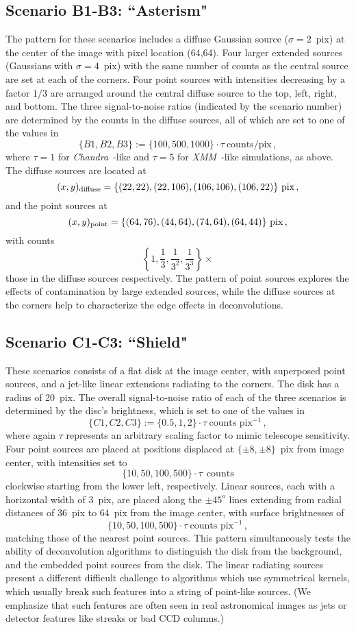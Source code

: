 \documentclass[twocolumn, linenumbers]{aastex631}
\newcommand{\chandra}{\textit{Chandra}~}
\newcommand{\xmm}{\textit{XMM}~}
\begin{document}
    \subsection{Scenario B1-B3: ``Asterism"}
    The pattern for these scenarios includes a diffuse Gaussian source ($\sigma=2$~pix) at the center of the image with pixel location (64,64). Four larger extended sources (Gaussians with $\sigma=4$~pix) with the same number of counts as the central source are set at each of the corners.  Four point sources with intensities decreasing by a factor $1/3$ are arranged around the central diffuse source to the top, left, right, and bottom.  The three signal-to-noise ratios (indicated by the scenario number) are determined by the counts in the diffuse sources, all of which are set to one of the values in $$\{B1, B2, B3\} := \{100, 500, 1000\} \cdot \tau ~\textrm{counts}/\textrm{pix}\,,$$ where $\tau=1$ for \chandra-like and $\tau=5$ for \xmm-like simulations, as above.  The diffuse sources are located at
    $$(x,y)_{{\rm diffuse}} = \{(22,22), (22,106), (106,106), (106,22)\} ~\textrm{pix} \,,$$
    and the point sources at
    $$(x,y)_{{\rm point}} = \{(64,76), (44,64), (74,64), (64,44)\} ~\textrm{pix}\,,$$
    with counts
    $$\left\{1, \frac{1}{3}, \frac{1}{3^2}, \frac{1}{3^3} \right\} \times$$
    those in the diffuse sources respectively.  The pattern of point sources explores the effects of contamination by large extended sources, while the diffuse sources at the corners help to characterize the edge effects in deconvolutions.

    \subsection{Scenario C1-C3: ``Shield"}
    These scenarios consists of a flat disk at the image center, with superposed point sources, and a jet-like linear extensions radiating to the corners.  The disk has a radius of 20~pix. The overall signal-to-noise ratio of each of the three scenarios is determined by the disc's brightness, which is set to one of the values in 
    $$\{C1, C2, C3\} := \{0.5, 1, 2\} \cdot \tau ~\textrm{counts~pix}^{-1} \,,$$
    where again $\tau$ represents an arbitrary scaling factor to mimic telescope sensitivity.  Four point sources are placed at positions displaced at $\{\pm8,\pm8\}$~pix from image center, with intensities set to
    $$\{10, 50, 100, 500\} \cdot \tau ~~\textrm{counts}$$
    clockwise starting from the lower left, respectively.  Linear sources, each with a horizontal width of 3~pix, are placed along the $\pm45^o$ lines extending from radial distances of 36~pix to 64~pix from the image center, with surface brightnesses of 
    $$\{10, 50, 100, 500\} \cdot \tau ~\textrm{counts~pix}^{-1} \,,$$
    matching those of the nearest point sources.  This pattern simultaneously tests the ability of deconvolution algorithms to distinguish the disk from the background, and the embedded point sources from the disk.  The linear radiating sources present a different difficult challenge to algorithms which use symmetrical kernels, which usually break such features into a string of point-like sources. (We emphasize that such features are often seen in real astronomical images as jets or detector features like streaks or bad CCD columns.) 
\end{document}
